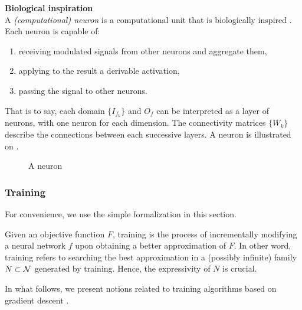 \begin{remark}\textbf{Biological inspiration}\\
A \emph{(computational) neuron} is a computational unit that is biologically inspired \citep{mcculloch1943logical}. Each neuron is capable of:
\begin{enumerate}
\item receiving modulated signals from other neurons and aggregate them,
\item applying to the result a derivable activation,
\item passing the signal to other neurons.
\end{enumerate}
That is to say, each domain $\{I_{f_k}\}$ and $O_f$ can be interpreted as a layer of neurons, with one neuron for each dimension. The connectivity matrices $\{W_k\}$ describe the connections between each successive layers.
A neuron is illustrated on .
\end{remark}

\begin{figure}[H]
\centering
{}
\caption{A neuron}
\label{fig:neuron}
\end{figure}

\subsubsection{Training}
\label{sec:training}

For convenience, we use the simple formalization in this section.

Given an objective function $F$, training is the process of incrementally modifying a neural network $f$ upon obtaining a better approximation of $F$. In other word, training refers to searching the best approximation in a (possibly infinite) family $N \subset \mathcal{N}$ generated by training. Hence, the expressivity of $N$ is crucial.

In what follows, we present notions related to training algorithms based on gradient descent \citep{widrow1960adaptive}.


